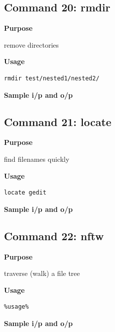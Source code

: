 \documentclass{article}
\begin{document}
\subsection{Command 20: rmdir} 
\textbf{Purpose}
\begin{flushleft}
 remove directories
\end{flushleft}
\textbf{Usage}
\begin{verbatim}
rmdir test/nested1/nested2/
\end{verbatim}
\textbf{Sample i/p and o/p}
\begin{figure}[H] 
\end{figure}
\subsection{Command 21: locate} 
\textbf{Purpose}
\begin{flushleft}
 find filenames quickly
\end{flushleft}
\textbf{Usage}
\begin{verbatim}
locate gedit
\end{verbatim}
\textbf{Sample i/p and o/p}
\begin{figure}[H] 
\end{figure}
\subsection{Command 22: nftw} 
\textbf{Purpose}
\begin{flushleft}
 traverse (walk) a file tree
\end{flushleft}
\textbf{Usage}
\begin{verbatim}
%usage%
\end{verbatim}
\textbf{Sample i/p and o/p}
\begin{figure}[H] 
\end{figure}
\end{document}
